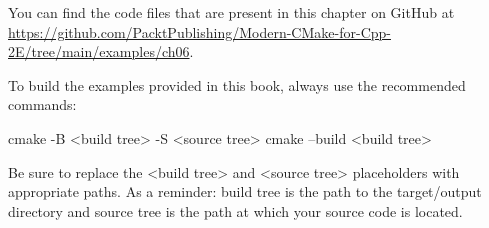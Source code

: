 You can find the code files that are present in this chapter on GitHub at \url{https://github.com/PacktPublishing/Modern-CMake-for-Cpp-2E/tree/main/examples/ch06}.

To build the examples provided in this book, always use the recommended commands:

\begin{shell}
cmake -B <build tree> -S <source tree>
cmake --build <build tree>
\end{shell}

Be sure to replace the <build tree> and <source tree> placeholders with appropriate paths. As a reminder: build tree is the path to the target/output directory and source tree is the path at which your source code is located.
